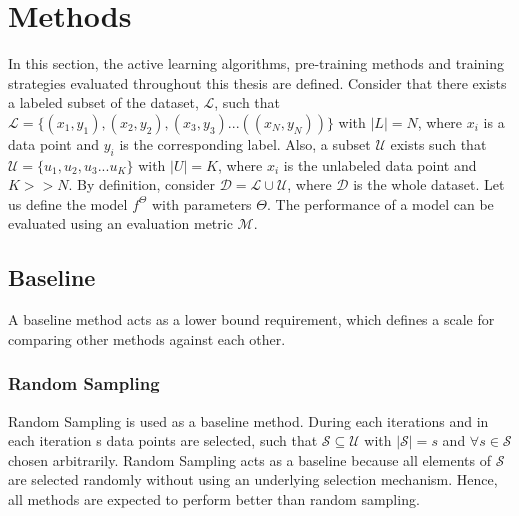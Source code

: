 
\chapter{Methods}\label{chapter:methods}
In this section, the active learning algorithms, pre-training methods and training strategies evaluated throughout this thesis are defined. Consider that there exists a labeled subset of the dataset, $\mathcal{L}$, such that $\mathcal{L} = \{(x_1, y_1), (x_2, y_2), (x_3, y_3) ... ((x_N, y_N))\}$ with $|L| = N$, where $x_i$ is a data point and $y_i$ is the corresponding label. Also, a subset $\mathcal{U}$ exists such that $\mathcal{U} = \{u_1, u_2, u_3 ... u_K\}$ with $|U| = K$, where $x_i$ is the unlabeled data point and $K>>N$. By definition, consider $\mathcal{D} = \mathcal{L} \cup \mathcal{U}$, where $\mathcal{D}$ is the whole dataset. Let us define the model $f^\Theta$ with parameters $\Theta$. The performance of a model can be evaluated using an evaluation metric $\mathcal{M}$.



\section{Baseline}\label{section:baseline}
A baseline method acts as a lower bound requirement, which defines a scale for comparing other methods against each other.
\subsection{Random Sampling}
Random Sampling is used as a baseline method. During each iterations and in each iteration s data points are selected, such that $\mathcal{S} \subseteq \mathcal{U}$ with $|\mathcal{S}| = s$ and $\forall s \in \mathcal{S}$ chosen arbitrarily. Random Sampling acts as a baseline because all elements of $\mathcal{S}$ are selected randomly without using an underlying selection mechanism. Hence, all methods are expected to perform better than random sampling.

